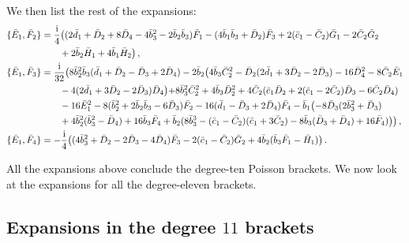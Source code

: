 \documentclass[10pt]{amsart}
\theoremstyle{definition}
\theoremstyle{corollary}
\theoremstyle{remark}
\theoremstyle{conclusion}
\begin{document}
We then list the rest of the expansions:\begin{align} 
\{\bar{E}_1, \bar{F}_2\}&=\frac{{\rm i}}{4}\bigl( (2\bar{d}_1+\bar{D}_2+8\bar{D}_4-4\bar{b}_3^2-2\bar{b}_2\bar{b}_3)\bar{F}_1-(4 \bar{b}_1 \bar{b}_3+\bar{D}_2)\bar{F}_3+2(\bar{c}_1-\bar{C}_2)\bar{G}_1-2\bar{C}_2\bar{G}_2\nonumber\\
& \hskip 0.7cm +2\bar{b}_2\bar{H}_1+4\bar{b}_1 \bar{H}_2\bigl) \, , \nonumber\\
 \{\bar{E}_1, \bar{F}_3\}&=\frac{{\rm i}}{32}\bigl(8 \bar{b}_2^2 \bar{b}_3(\bar{d}_1+\bar{D}_2-\bar{D}_3+2\bar{D}_4)-2\bar{b}_2\bigl(4 \bar{b}_3 \bar{C}_2^2-\bar{D}_2(2 \bar{d}_1+3\bar{D}_2-2\bar{D}_3) -16 \bar{D}_4^2-8 \bar{C}_2 \bar{E}_1\nonumber\\
& \hskip 0.7cm -4(2\bar{d}_1+3\bar{D}_2-2\bar{D}_3)\bar{D}_4 \bigl) +8\bar{b}_3^2 \bar{C}_2^2+4\bar{b}_3 \bar{D}_2^2+4 \bar{C}_2(\bar{c}_1\bar{D}_2+2(\bar{c}_1-2\bar{C}_2)\bar{D}_3-6\bar{C}_2 \bar{D}_4)\nonumber\\
&  \hskip 0.7cm -16 \bar{E}_1^2-8(\bar{b}_2^2+2\bar{b}_2\bar{b}_3-6\bar{D}_3)\bar{F}_2-16(\bar{d}_1-\bar{D}_3+2\bar{D}_4)\bar{F}_4-\bar{b}_1\bigl( -8 \bar{D}_3(2 \bar{b}_3^2+\bar{D}_3)\nonumber\\
&  \hskip 0.7cm+4\bar{b}_2^2(\bar{b}_3^2-\bar{D}_4)+16 \bar{b}_3 \bar{F}_4+\bar{b}_2(8 \bar{b}_3^3-(\bar{c}_1-\bar{C}_2)(\bar{c}_1+3\bar{C}_2)-8\bar{b}_3(\bar{D}_3+\bar{D}_4)+16 \bar{F}_4)\bigl)\bigl) \,,\nonumber \\
\{\bar{E}_1, \bar{F}_4\}&=-\frac{{\rm i}}{4}\bigl((4 \bar{b}_3^2+\bar{D}_2-2\bar{D}_3-4\bar{D}_4)\bar{F}_3-2(\bar{c}_1-\bar{C}_2)\bar{G}_2+4 \bar{b}_2(\bar{b}_3 \bar{F}_1-\bar{H}_1) \bigl) \, .
\end{align}

\vskip 0.5cm

All the expansions above conclude the degree-ten Poisson brackets. We now look at the expansions for all the degree-eleven brackets.
\subsection{Expansions in the degree $11$ brackets}
\end{document}
